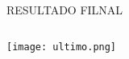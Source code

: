 \begin{frame}[t]{RESULTADO FILNAL}
    \transboxout[duration=0.5]
    \begin{columns}
            \texttt{[image: ultimo.png]}
    \end{columns}
\end{frame}
